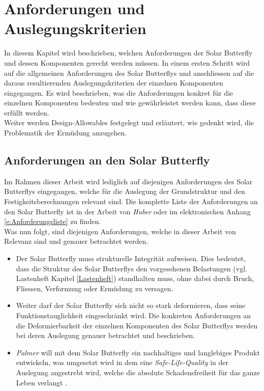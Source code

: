 \section{Anforderungen und Auslegungskriterien}
In diesem Kapitel wird beschrieben, welchen Anforderungen der Solar Butterfly und dessen Komponenten gerecht werden müssen. In einem ersten Schritt wird auf die allgemeinen Anforderungen des Solar Butterflys und anschliessen auf die daraus resultierenden Auslegungskriterien der einzelnen Komponenten eingegangen. Es wird beschrieben, was die Anforderungen konkret für die einzelnen Komponenten bedeuten und wie gewährleistet werden kann, dass diese erfüllt werden.\\
Weiter werden  Design-Allowables festgelegt und erläutert, wie gedenkt wird, die Problematik der Ermüdung	anzugehen.


\subsection{Anforderungen an den Solar Butterfly}
Im Rahmen dieser Arbeit wird lediglich auf diejenigen Anforderungen des Solar Butterflys eingegangen, welche für die Auslegung der Grundstruktur und den Festigkeitsberechnungen relevant sind. Die komplette Liste der Anforderungen an den Solar Butterfly ist in der Arbeit von \emph{Huber} \cite{Huber} oder im elektronischen Anhang \ref{e:Anforderungsliste} zu finden.\\
Was nun folgt, sind diejenigen Anforderungen, welche in dieser Arbeit von Relevanz sind und genauer betrachtet werden.

\begin{itemize}
  \item Der Solar Butterfly muss strukturelle Integrität aufweisen. Dies bedeutet, dass die Struktur des Solar Butterflys den vorgesehenen Belastungen (vgl. Lastenheft Kapitel \ref{Lastenheft}) standhalten muss, ohne dabei durch Bruch, Fliessen, Verformung oder Ermüdung zu versagen.
  \item Weiter darf der Solar Butterfly sich nicht so stark deformieren, dass seine Funktionstauglichkeit eingeschränkt wird. Die konkreten Anforderungen an die Deformierbarkeit der einzelnen Komponenten des Solar Butterflys werden bei deren Auslegung genauer betrachtet und beschrieben.
  \item \emph{Palmer} will mit dem Solar Butterfly ein nachhaltiges und langlebiges Produkt entwickeln, was umgesetzt wird in dem eine \emph{Safe-Life-Quality} in der Auslegung angestrebt wird, welche \glqq die absolute Schadensfreiheit für das ganze Leben\grqq{} verlangt \cite{klein}.
\end{itemize}

